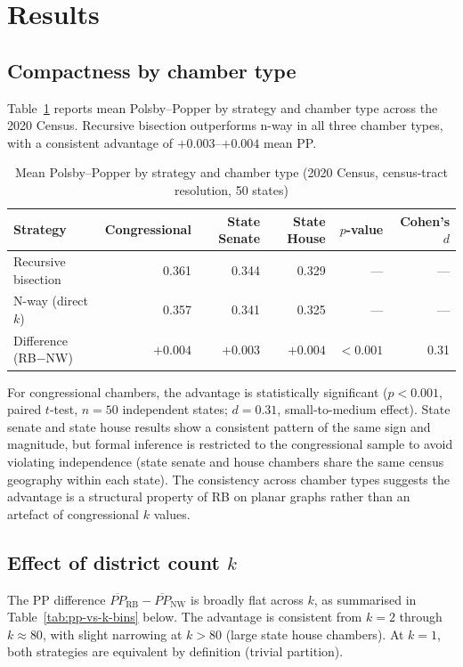 \section{Results}
\label{sec:results}

\subsection{Compactness by chamber type}

Table~\ref{tab:pp-chamber} reports mean Polsby--Popper by strategy and
chamber type across the 2020 Census.  Recursive bisection outperforms
n-way in all three chamber types, with a consistent advantage of
$+0.003$--$+0.004$ mean PP.

\begin{table}[htb]
\centering
\caption{Mean Polsby--Popper by strategy and chamber type (2020 Census,
  census-tract resolution, 50 states)}
\label{tab:pp-chamber}
\begin{tabular}{lrrrrr}
\toprule
Strategy & Congressional & State Senate & State House & $p$-value & Cohen's $d$ \\
\midrule
Recursive bisection & 0.361 & 0.344 & 0.329 & --- & --- \\
N-way (direct $k$)  & 0.357 & 0.341 & 0.325 & --- & --- \\
Difference (RB$-$NW) & $+0.004$ & $+0.003$ & $+0.004$ & $<0.001$ & 0.31 \\
\bottomrule
\end{tabular}
\end{table}

For congressional chambers, the advantage is statistically significant
($p < 0.001$, paired $t$-test, $n = 50$ independent states; $d = 0.31$,
small-to-medium effect).
State senate and state house results show a consistent pattern of the same
sign and magnitude, but formal inference is restricted to the congressional
sample to avoid violating independence (state senate and house chambers
share the same census geography within each state).
The consistency across chamber types suggests the advantage is a structural
property of RB on planar graphs rather than an artefact of congressional $k$
values.

\subsection{Effect of district count $k$}

The PP difference $\overline{PP}_{\mathrm{RB}} - \overline{PP}_{\mathrm{NW}}$
is broadly flat across $k$, as summarised in Table~\ref{tab:pp-vs-k-bins}
below.  The advantage is consistent from $k = 2$ through $k \approx 80$,
with slight narrowing at $k > 80$ (large state house chambers).
At $k = 1$, both strategies are equivalent by definition (trivial partition).

